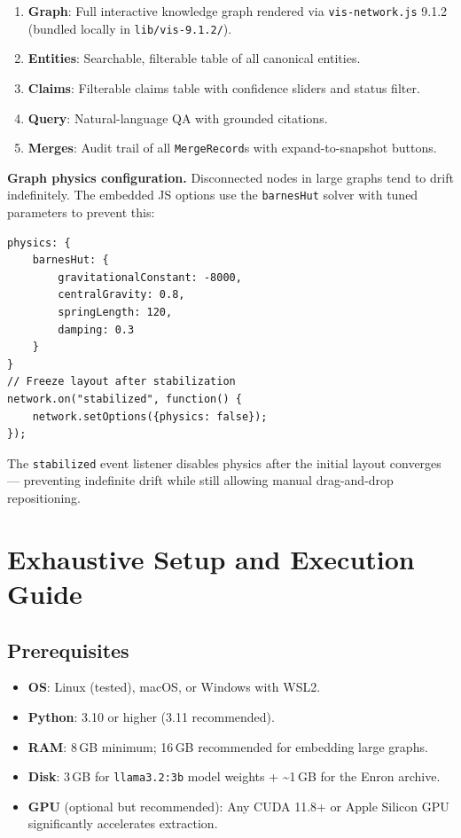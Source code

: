 \documentclass[12pt,a4paper]{article}
\begin{document}
\begin{enumerate}
    \item \textbf{Graph}: Full interactive knowledge graph rendered via \texttt{vis-network.js} 9.1.2 (bundled locally in \texttt{lib/vis-9.1.2/}).
    \item \textbf{Entities}: Searchable, filterable table of all canonical entities.
    \item \textbf{Claims}: Filterable claims table with confidence sliders and status filter.
    \item \textbf{Query}: Natural-language QA with grounded citations.
    \item \textbf{Merges}: Audit trail of all \texttt{MergeRecord}s with expand-to-snapshot buttons.
\end{enumerate}

\textbf{Graph physics configuration.} Disconnected nodes in large graphs tend to drift indefinitely. The embedded JS options use the \texttt{barnesHut} solver with tuned parameters to prevent this:

\begin{lstlisting}[language={},caption=vis-network.js physics config (06\_app.py)]
physics: {
    barnesHut: {
        gravitationalConstant: -8000,
        centralGravity: 0.8,
        springLength: 120,
        damping: 0.3
    }
}
// Freeze layout after stabilization
network.on("stabilized", function() {
    network.setOptions({physics: false});
});
\end{lstlisting}

The \texttt{stabilized} event listener disables physics after the initial layout converges — preventing indefinite drift while still allowing manual drag-and-drop repositioning.

\section{Exhaustive Setup and Execution Guide}

\subsection{Prerequisites}

\begin{itemize}
    \item \textbf{OS}: Linux (tested), macOS, or Windows with WSL2.
    \item \textbf{Python}: 3.10 or higher (3.11 recommended).
    \item \textbf{RAM}: 8\,GB minimum; 16\,GB recommended for embedding large graphs.
    \item \textbf{Disk}: 3\,GB for \texttt{llama3.2:3b} model weights + \textasciitilde{}1\,GB for the Enron archive.
    \item \textbf{GPU} (optional but recommended): Any CUDA 11.8+ or Apple Silicon GPU significantly accelerates extraction.
\end{itemize}
\end{document}

